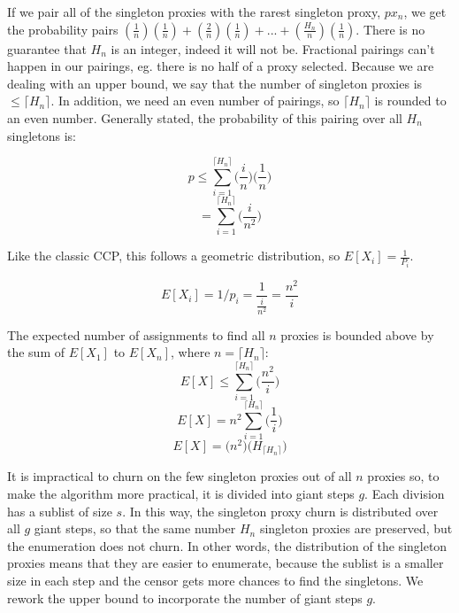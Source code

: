 If we pair all of the singleton proxies with the rarest singleton proxy, $px_n$, we get the probability pairs $(\frac{1}{n})(\frac{1}{n}) + (\frac{2}{n})(\frac{1}{n}) + ... + (\frac{H_n}{n})(\frac{1}{n})$. There is no guarantee that $H_n$ is an integer, indeed it will not be. Fractional pairings can't happen in our pairings, eg. there is no half of a proxy selected. Because we are dealing with an upper bound, we say that the number of singleton proxies is $\leq \lceil{H_n}\rceil$. In addition, we need an even number of pairings, so $\lceil{H_n}\rceil$ is rounded to an even number. Generally stated, the probability of this pairing over all $H_n$ singletons is:

$$p \leq \sum_{i=1}^{\lceil{H_n}\rceil} \bigg(\frac{i}{n}\bigg) \bigg(\frac{1}{n}\bigg)$$
$$= \sum_{i=1}^{\lceil{H_n}\rceil} \bigg(\frac{i}{n^2}\bigg)$$

Like the classic CCP, this follows a geometric distribution, so $E[X_i] =\frac{1}{P_i}$. 

$$E[X_i] = 1/p_i = \frac{1}{\frac{i}{n^2}} = \frac{n^2}{i}$$

The expected number of assignments to find all $n$ proxies is bounded above by the sum of $E[X_1]$ to $E[X_n]$, where $n=\lceil{H_n}\rceil$:\\

$$E[X] \leq \sum_{i=1}^{\lceil{H_n}\rceil} \bigg(\frac{n^2}{i}\bigg)$$
$$E[X] = n^2 \sum_{i=1}^{\lceil{H_n}\rceil} \bigg(\frac{1}{i}\bigg)$$
$$E[X] = \bigg(n^2\bigg) \bigg(H_{\lceil{H_n}\rceil}\bigg)$$

It is impractical to churn on the few singleton proxies out of all $n$ proxies so, to make the algorithm more practical, it is divided into giant steps $g$. Each division has a sublist of size $s$. In this way, the singleton proxy churn is distributed over all $g$ giant steps, so that the same number $H_n$ singleton proxies are preserved, but the enumeration does not churn. In other words, the distribution of the singleton proxies means that they are easier to enumerate, because the sublist is a smaller size in each step and the censor gets more chances to find the singletons.  We rework the upper bound to incorporate the number of giant steps $g$.

